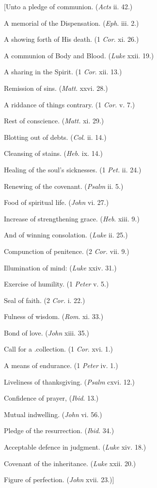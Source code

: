 [Unto a pledge of communion. (\emph{Acts} ii. 42.)

A memorial of the Dispensation. (\emph{Eph}. iii. 2.)

A showing forth of His death. (1 \emph{Cor}. xi. 26.)

A communion of Body and Blood. (\emph{Luke} xxii. 19.)

A sharing in the Spirit. (1 \emph{Cor}. xii. 13.)

Remission of sins. (\emph{Matt}. xxvi. 28.)

A riddance of things contrary. (1 \emph{Cor. }v. 7.)

Rest of conscience. (\emph{Matt. }xi. 29.)

Blotting out of debts. (\emph{Col}. ii. 14.)

Cleansing of stains. (\emph{Heb}. ix. 14.)

Healing of the soul’s sicknesses. (1 \emph{Pet. }ii. 24.)

Renewing of the covenant. (\emph{Psalm} ii. 5.)

Food of spiritual life. (\emph{John} vi. 27.)

Increase of strengthening grace. (\emph{Heb}. xiii. 9.)

And of winning consolation. (\emph{Luke }ii. 25.)

Compunction of penitence. (2 \emph{Cor. }vii. 9.)

Illumination of mind: (\emph{Luke} xxiv. 31.)

Exercise of humility. (1 \emph{Peter} v. 5.)

Seal of faith. (2 \emph{Cor. }i. 22.)

Fulness of wisdom. (\emph{Rom}. xi. 33.)

Bond of love. (\emph{John} xiii. 35.)

Call for a .collection. (1 \emph{Cor}. xvi. 1.)

A means of endurance. (1 \emph{Peter }iv. 1.)

Liveliness of thanksgiving. (\emph{Psalm} cxvi. 12.)

Confidence of prayer, (\emph{Ibid}. 13.)

Mutual indwelling. (\emph{John} vi. 56.)

Pledge of the resurrection. (\emph{Ibid}. 34.)

Acceptable defence in judgment. (\emph{Luke} xiv. 18.)

Covenant of the inheritance. (\emph{Luke} xxii. 20.)

Figure of perfection. (\emph{John }xvii. 23.)]

